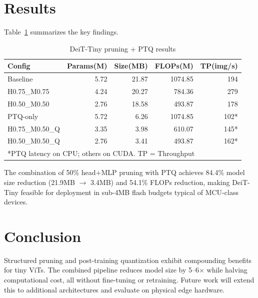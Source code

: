 \documentclass[conference]{IEEEtran}
\begin{document}
\section{Results}
Table~\ref{tab:results} summarizes the key findings.

\begin{table}[ht]
\centering
\caption{DeiT-Tiny pruning + PTQ results}
\label{tab:results}
\small
\begin{tabular}{lrrrr}
\toprule
Config & Params(M) & Size(MB) & FLOPs(M) & TP(img/s) \\
\midrule
Baseline         & 5.72 & 21.87 & 1074.85 & 194 \\
H0.75\_M0.75     & 4.24 & 20.27 & 784.36  & 279 \\
H0.50\_M0.50     & 2.76 & 18.58 & 493.87  & 178 \\
PTQ-only         & 5.72 & 6.26  & 1074.85 & 102* \\
H0.75\_M0.50\_Q  & 3.35 & 3.98  & 610.07  & 145* \\
H0.50\_M0.50\_Q  & 2.76 & 3.41  & 493.87  & 162* \\
\bottomrule
\multicolumn{5}{l}{*PTQ latency on CPU; others on CUDA. TP = Throughput} \\
\end{tabular}
\end{table}

The combination of 50\% head+MLP pruning with PTQ achieves 84.4\% model
size reduction (21.9MB $\to$ 3.4MB) and 54.1\% FLOPs reduction, making
DeiT-Tiny feasible for deployment in sub-4MB flash budgets typical of
MCU-class devices.

\section{Conclusion}
Structured pruning and post-training quantization exhibit compounding
benefits for tiny ViTs. The combined pipeline reduces model size by
5--6$\times$ while halving computational cost, all without
fine-tuning or retraining. Future work will extend this to additional
architectures and evaluate on physical edge hardware.



\end{document}
